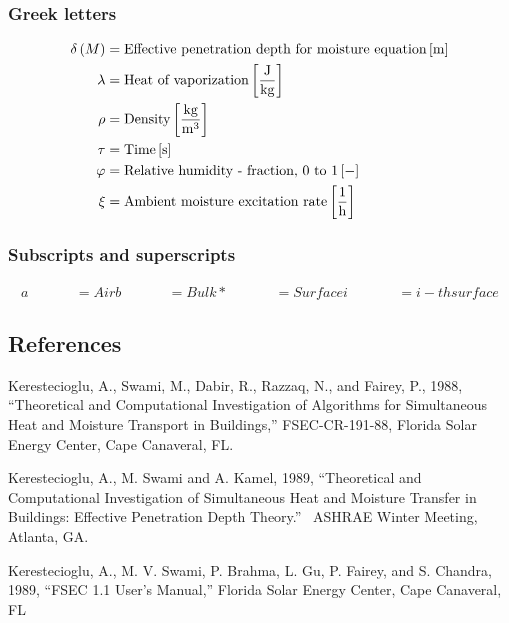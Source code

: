 \subsubsection{Greek letters}\label{greek-letters}
\begin{align*}	
  \delta\PB{M}  &= \text{Effective penetration depth for moisture equation} \bracketunits{\meter} \\
  \lambda       &= \text{Heat of vaporization} \bracketunits{\joule\per\kilogram} \\
  \rho          &= \text{Density} \bracketunits{\kilogram\per\cubic\meter} \\
  \tau          &= \text{Time} \bracketunits{\second} \\
  \varphi       &= \text{Relative humidity - fraction, 0 to 1} \bracketunits{-} \\
  \xi           &= \text{Ambient moisture excitation rate} \bracketunits{\per\hour}
\end{align*}

\subsubsection{Subscripts and superscripts}\label{subscripts-and-superscripts}
\begin{align*}	

a~~~~~~~~~~~~~~~ = Air

b~~~~~~~~~~~~~~~ = Bulk

*~~~~~~~~~ ~~~~~~ = Surface

i~~~~~~~~~~~~~~~~ = i-th surface
\end{align*}

\subsection{References}\label{references-019}

Kerestecioglu, A., Swami, M., Dabir, R., Razzaq, N., and Fairey, P., 1988, ``Theoretical and Computational Investigation of Algorithms for Simultaneous Heat and Moisture Transport in Buildings,'' FSEC-CR-191-88, Florida Solar Energy Center, Cape Canaveral, FL.

Kerestecioglu, A., M. Swami and A. Kamel, 1989, ``Theoretical and Computational Investigation of Simultaneous Heat and Moisture Transfer in Buildings: Effective Penetration Depth Theory.''~ ASHRAE Winter Meeting, Atlanta, GA.

Kerestecioglu, A., M. V. Swami, P. Brahma, L. Gu, P. Fairey, and S. Chandra, 1989, ``FSEC 1.1 User's Manual,'' Florida Solar Energy Center, Cape Canaveral, FL
